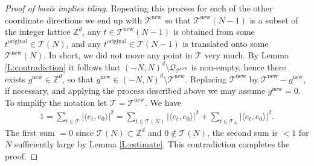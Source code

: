 \documentclass[12pt]{amsart}
\theoremstyle{plain}
\numberwithin{equation}{section}
\newcommand{\Q}{\ensuremath{\mathcal{Q}}\xspace}
\newcommand{\T}{\ensuremath{\mathcal{T}}\xspace}
\newcommand{\Zd}{\ensuremath{\mathbb{Z}^{d}}\xspace}
\begin{document}
\begin{proof}[Proof of basis implies tiling]
   Repeating this process for each of the other coordinate directions
   we end up with $\T^{\text{new}}$ so that $\T^{\text{new}}(N-1)$ is
   a subset of the integer lattice \Zd,
   any $t\in\T^{\text{new}}(N-1)$ is
   obtained from some $t^{\text{original}}\in\T(N)$, and any
   $t^{\text{original}}\in\T(N-1)$ is translated onto some
   $\T^{\text{new}}(N)$. In short, we did not move any point in \T
   very much. By Lemma \ref{L:contradiction} it follows that
   $(-N,N)^d\setminus\Q_{\T^{\text{new}}}$ is non-empty, hence there
   exists $g^{\text{new}}\in\Zd$, so that
   $g^{\text{new}}\in(-N,N)^d\setminus\T^{\text{new}}$. Replacing
   $\T^{\text{new}}$ by $\T^{\text{new}}-g^{\text{new}}$,
   if necessary, and
   applying the process described above we may assume
   $g^{\text{new}}=0$. To simplify the notation let
   $\T=\T^{\text{new}}$. We have
   \begin{align*}
      1=\sum_{t\in\T} |\langle e_t,e_0 \rangle|^2
       =\sum_{t\in\T(N)} |\langle e_t,e_0 \rangle|^2
          +\sum_{t\in\T_N} |\langle e_t,e_0 \rangle|^2.
   \end{align*}
   The first sum $=0$ since $\T(N)\subset\Zd$ and $0\notin\T(N)$, the
   second sum is $<1$ for $N$ sufficiently large
   by Lemma \ref{L:estimate}.
   This contradiction completes the proof.
\end{proof}
 
 

\end{document}
